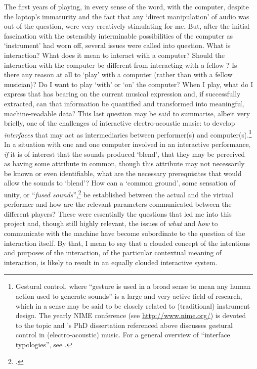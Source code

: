 The first years of playing, in every sense of the word, with the computer, despite the laptop's immaturity and the fact that any `direct manipulation' of audio was out of the question, were very creatively stimulating for me. But, after the initial fascination with the ostensibly interminable possibilities of the computer as `instrument' had worn off, several issues were called into question. What is interaction? What does it mean to interact with a computer? Should the interaction with the computer be different from interacting with a fellow ? Is there any reason at all to `play' with a computer (rather than with a fellow musician)? Do I want to play `with' or `on' the computer? When I play, what do I express that has bearing on the current musical expression and, if successfully extracted, can that information be quantified and transformed into meaningful, machine-readable data? This last question may be said to summarise, albeit very briefly, one of the challenges of interactive electro-acoustic music: to develop \emph{interfaces} that may act as intermediaries between performer(s) and computer(s).\footnote{Gestural control, where ``gesture is used in a broad sense to mean any human action used to generate sounds'' \parencite[E. R. Miranda and M. M. Wanderley as quoted in][39]{jensenius08} is a large and very active field of research, which in a sense may be said to be closely related to (traditional) instrument design. The yearly NIME conference (see \url{http://www.nime.org/}) is devoted to the topic and \citeauthor{jensenius08}'s PhD dissertation referenced above discusses gestural control in (electro-acoustic) music. For a general overview of ``interface typologies'', see \cite[135-42]{emmerson07}.} In a situation with one  and one computer involved in an interactive performance, \emph{if} it is of interest that the sounds produced `blend', that they may be perceived as having some attribute in common, though this attribute may not necessarily be known or even identifiable, what are the necessary prerequisites that would allow the sounds to `blend'? How can a `common ground', some sensation of unity, or ``\emph{fused sounds}'',\footcite[126]{emmerson07} be established between the actual and the virtual performer and how are the relevant parameters communicated between the different players? These were essentially the questions that led me into this project and, though still highly relevant, the issues of \emph{what} and \emph{how} to communicate with the machine have become subordinate to the question of the interaction itself. By that, I mean to say that a clouded concept of the intentions and purposes of the interaction, of the particular contextual meaning of interaction, is likely to result in an equally clouded interactive system. 

